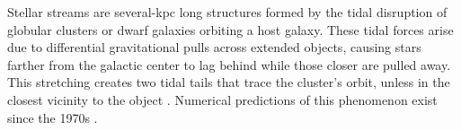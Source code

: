 \documentclass{aa}
\begin{document}

    

  Stellar streams are several-kpc long structures formed by the tidal disruption of globular clusters or dwarf galaxies orbiting a host galaxy. These tidal forces arise due to differential gravitational pulls across extended objects, causing stars farther from the galactic center to lag behind while those closer are pulled away. This stretching creates two tidal tails that trace the cluster's orbit, unless in the closest vicinity to the object \citep{2007ApJ...659.1212M}. Numerical predictions of this phenomenon exist since the 1970s \citep[see, for example][]{1975AJ.....80..290K}. 
  
\end{document}
